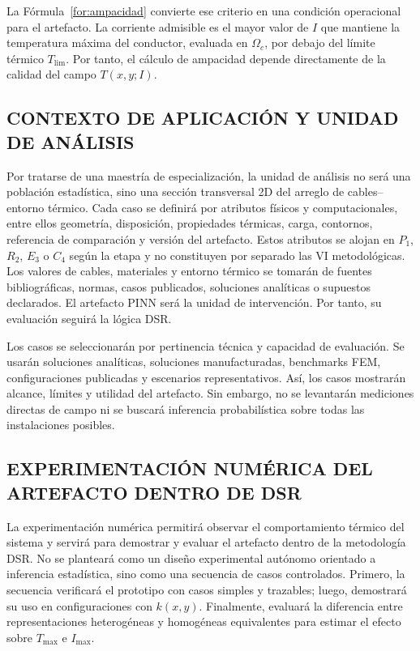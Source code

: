 \documentclass[11pt,a4paper,oneside]{report}
\newcommand{\Tmax}{T_{\max}}
\newcommand{\Imax}{I_{\max}}
\newcommand{\kx}{k(x,y)}
\begin{document}
La Fórmula~\ref{for:ampacidad} convierte ese criterio en una condición operacional para el artefacto. La corriente admisible es el mayor valor de $I$ que mantiene la temperatura máxima del conductor, evaluada en $\Omega_c$, por debajo del límite térmico $T_{\mathrm{lim}}$. Por tanto, el cálculo de ampacidad depende directamente de la calidad del campo $T(x,y;I)$.

\subsection{CONTEXTO DE APLICACIÓN Y UNIDAD DE ANÁLISIS}
\label{subsec:unidad-analisis}

Por tratarse de una maestría de especialización, la unidad de análisis no será una población estadística, sino una sección transversal 2D del arreglo de cables--entorno térmico. Cada caso se definirá por atributos físicos y computacionales, entre ellos geometría, disposición, propiedades térmicas, carga, contornos, referencia de comparación y versión del artefacto. Estos atributos se alojan en $P_1$, $R_2$, $E_3$ o $C_4$ según la etapa y no constituyen por separado las VI metodológicas. Los valores de cables, materiales y entorno térmico se tomarán de fuentes bibliográficas, normas, casos publicados, soluciones analíticas o supuestos declarados. El artefacto PINN será la unidad de intervención. Por tanto, su evaluación seguirá la lógica DSR.

Los casos se seleccionarán por pertinencia técnica y capacidad de evaluación. Se usarán soluciones analíticas, soluciones manufacturadas, benchmarks FEM, configuraciones publicadas y escenarios representativos. Así, los casos mostrarán alcance, límites y utilidad del artefacto. Sin embargo, no se levantarán mediciones directas de campo ni se buscará inferencia probabilística sobre todas las instalaciones posibles.

\subsection{EXPERIMENTACIÓN NUMÉRICA DEL ARTEFACTO DENTRO DE DSR}

La experimentación numérica permitirá observar el comportamiento térmico del sistema y servirá para demostrar y evaluar el artefacto dentro de la metodología DSR. No se planteará como un diseño experimental autónomo orientado a inferencia estadística, sino como una secuencia de casos controlados. Primero, la secuencia verificará el prototipo con casos simples y trazables; luego, demostrará su uso en configuraciones con $\kx$. Finalmente, evaluará la diferencia entre representaciones heterogéneas y homogéneas equivalentes para estimar el efecto sobre $\Tmax$ e $\Imax$.
\end{document}

